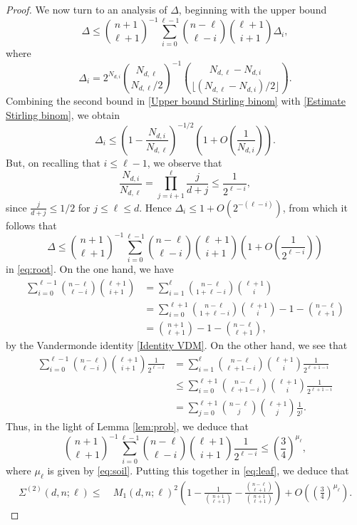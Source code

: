 \documentclass[11pt, reqno]{amsart}
\numberwithin{equation}{section}
\renewcommand{\leq}{\leqslant}
\begin{document}
\begin{proof}
We now turn to an analysis of $\Delta$, beginning with the upper bound
\begin{equation}\label{eq:root}
\Delta\leq 
\binom{n+1}{\ell+1}^{-1}
 \sum_{i=0}^{\ell-1} 
 \binom{n-\ell}{\ell-i} \binom{\ell+1}{i+1} \Delta_i,
\end{equation}
where
$$
\Delta_i= 2^{N_{d,i}} 
\binom{N_{d,\ell}}{
N_{d,\ell}/2}^{-1}
 \binom{N_{d,\ell}-N_{d,i}}{
\lfloor (N_{d,\ell}-N_{d,i})/2\rfloor
}.
$$
Combining the second bound in \eqref{Upper bound Stirling binom} with 
\eqref{Estimate Stirling binom}, we obtain  
$$
\Delta_i\leq \left(1-\frac{N_{d,i}}{N_{d,\ell}}\right)^{-1/2}\left(1+O\left(\frac{1}{N_{d,i}}\right)\right).
$$
But, on recalling that $i\leq \ell-1$,  we observe that 
$$
\frac{N_{d,i}}{N_{d,\ell}}=\prod_{j=i+1}^\ell \frac{j}{d+j}\leq \frac{1}{2^{\ell-i}},
$$
since $\frac{j}{d+j}\leq 1/2$ for $j\leq \ell\leq d$. Hence
$
\Delta_i\leq 1+O( 2^{-(\ell-i)})$, 
from which it follows that 
$$
\Delta\leq 
\binom{n+1}{\ell+1}^{-1}
 \sum_{i=0}^{\ell-1} 
 \binom{n-\ell}{\ell-i} \binom{\ell+1}{i+1} \left(1+O\left( \frac{1}{2^{\ell-i}}\right)\right)
$$
in \eqref{eq:root}.
On the one hand, we have 
\begin{align*}
 \sum_{i=0}^{\ell-1} \binom{n-\ell}{\ell-i} \binom{\ell+1}{i+1}
 &= 
 \sum_{i=1}^{\ell} \binom{n-\ell}{1+\ell-i} \binom{\ell+1}{i}\\
 &=
 \sum_{i=0}^{\ell+1} \binom{n-\ell}{1+\ell-i} \binom{\ell+1}{i}-1-\binom{n-\ell}{\ell+1}\\
&= \binom{n+1}{\ell+1}-1-\binom{n-\ell}{\ell+1},
\end{align*}
by the  Vandermonde identity \eqref{Identity VDM}.
On the other hand, we see that 
\begin{align*}
\sum_{i=0}^{\ell-1} 
 \binom{n-\ell}{\ell-i} \binom{\ell+1}{i+1} \frac{1}{2^{\ell-i}}
&=
\sum_{i=1}^{\ell} 
 \binom{n-\ell}{\ell+1-i} \binom{\ell+1}{i} \frac{1}{2^{\ell+1-i}}\\
 &\leq 
\sum_{i=0}^{\ell+1} 
 \binom{n-\ell}{\ell+1-i} \binom{\ell+1}{i} \frac{1}{2^{\ell+1-i}}\\
 &=
\sum_{j=0}^{\ell+1} 
 \binom{n-\ell}{j} \binom{\ell+1}{j} \frac{1}{2^{j}}.
\end{align*}
Thus, in the light of Lemma \ref{lem:prob}, we deduce that 
$$
\binom{n+1}{\ell+1}^{-1}
\sum_{i=0}^{\ell-1} 
 \binom{n-\ell}{\ell-i} \binom{\ell+1}{i+1} \frac{1}{2^{\ell-i}}
\leq 
\left(\frac{3}{4}\right)^{\mu_\ell},
$$
where $\mu_\ell$ is given by \eqref{eq:soil}.
Putting this together in \eqref{eq:leaf}, we deduce that 
\begin{equation}\label{eq:stalk}
\begin{split}
\Sigma^{(2)}(d,n;\ell)
\leq~& M_1(d,n;\ell)^2\left(1
-\frac{1}{\binom{n+1}{\ell+1}}
-\frac{\binom{n-\ell}{\ell+1}}{\binom{n+1}{\ell+1}}\right) +O\left( 
\left(\frac{3}{4}\right)^{\mu_\ell}
\right).
\end{split}
\end{equation}



\end{proof}
\end{document}
